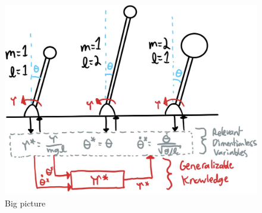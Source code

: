 \begin{figure}[t]
\vspace{-5pt}
\begin{center}
\includegraphics[width=0.99\linewidth]{fig/bigpicture2.jpg}
\caption{Big picture}\label{fig:big_picture}
\end{center}
\vspace{-25pt}
\end{figure}



